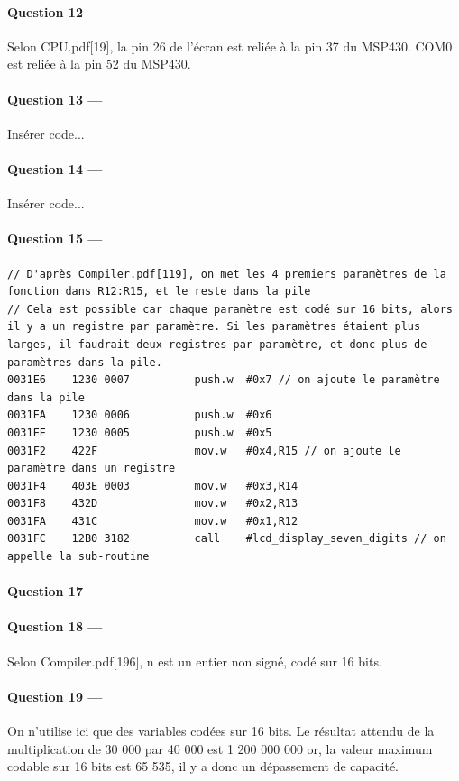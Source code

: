 \documentclass[a4paper,11pt,article]{memoir}
\begin{document}
\paragraph{Question 12 ---}  Selon CPU.pdf[19], la pin 26 de l'écran est reliée à la pin 37 du MSP430. COM0 est reliée à la pin 52 du MSP430.

\paragraph{Question 13 ---}  Insérer code...

\paragraph{Question 14 ---}  Insérer code...

\paragraph{Question 15 ---}
\begin{verbatim}
// D'après Compiler.pdf[119], on met les 4 premiers paramètres de la fonction dans R12:R15, et le reste dans la pile
// Cela est possible car chaque paramètre est codé sur 16 bits, alors il y a un registre par paramètre. Si les paramètres étaient plus larges, il faudrait deux registres par paramètre, et donc plus de paramètres dans la pile.
0031E6    1230 0007          push.w  #0x7 // on ajoute le paramètre dans la pile
0031EA    1230 0006          push.w  #0x6
0031EE    1230 0005          push.w  #0x5
0031F2    422F               mov.w   #0x4,R15 // on ajoute le paramètre dans un registre
0031F4    403E 0003          mov.w   #0x3,R14
0031F8    432D               mov.w   #0x2,R13
0031FA    431C               mov.w   #0x1,R12
0031FC    12B0 3182          call    #lcd_display_seven_digits // on appelle la sub-routine
\end{verbatim}

\paragraph{Question 17 ---}

\paragraph{Question 18 ---}  Selon Compiler.pdf[196], n est un entier non signé, codé sur 16 bits.

\paragraph{Question 19 ---}  On n'utilise ici que des variables codées sur 16 bits. Le résultat attendu de la multiplication de 30 000 par 40 000 est 1 200 000 000 or, la valeur maximum codable sur 16 bits est 65 535, il y a donc un dépassement de capacité.
\end{document}
